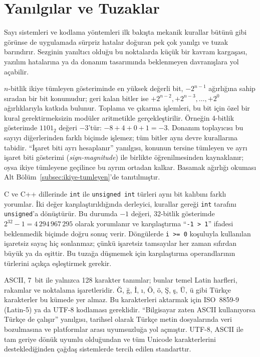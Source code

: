 \section{Yanılgılar ve Tuzaklar}
\label{sec:yanilgilar-tuzaklar-sayi-sistemleri}

Sayı sistemleri ve kodlama yöntemleri ilk bakışta mekanik kurallar bütünü gibi görünse de uygulamada sürpriz hatalar doğuran pek çok yanılgı ve tuzak barındırır. Sezginin yanıltıcı olduğu bu noktalarda küçük bir kavram kargaşası, yazılım hatalarına ya da donanım tasarımında beklenmeyen davranışlara yol açabilir.

$n$-bitlik ikiye tümleyen gösteriminde en yüksek değerli bit, $-2^{n-1}$ ağırlığına sahip sıradan bir bit konumudur; geri kalan bitler ise $+2^{n-2}, +2^{n-3}, \ldots, +2^0$ ağırlıklarıyla katkıda bulunur. Toplama ve çıkarma işlemleri, bu bit için özel bir kural gerektirmeksizin modüler aritmetikle gerçekleştirilir. Örneğin 4-bitlik gösterimde $1101_2$ değeri $-3$'tür: $-8 + 4 + 0 + 1 = -3$. Donanım toplayıcısı bu sayıyı diğerlerinden farklı biçimde işlemez; tüm bitler aynı devre kurallarına tabidir. ``İşaret biti ayrı hesaplanır'' yanılgısı, konunun tersine tümleyen ve ayrı işaret biti gösterimi (\emph{sign-magnitude}) ile birlikte öğrenilmesinden kaynaklanır; oysa ikiye tümleyene geçilince bu ayrım ortadan kalkar. Basamak ağırlığı okuması Alt Bölüm~\ref{subsec:ikiye-tumleyen}'de tanıtılmıştır.

C ve C++ dillerinde \texttt{int} ile \texttt{unsigned int} türleri aynı bit kalıbını farklı yorumlar. İki değer karşılaştırıldığında derleyici, kurallar gereği \texttt{int} tarafını \texttt{unsigned}'a dönüştürür. Bu durumda $-1$ değeri, 32-bitlik gösterimde $2^{32}-1 = 4\,294\,967\,295$ olarak yorumlanır ve karşılaştırma ``\texttt{-1 > 1}'' ifadesi beklenmedik biçimde doğru sonuç verir. Döngülerde \texttt{i >= 0} koşuluyla kullanılan işaretsiz sayaç hiç sonlanmaz; çünkü işaretsiz tamsayılar her zaman sıfırdan büyük ya da eşittir. Bu tuzağa düşmemek için karşılaştırma operandlarının türlerini açıkça eşleştirmek gerekir.

ASCII, 7~bit ile yalnızca 128 karakter tanımlar; bunlar temel Latin harfleri, rakamlar ve noktalama işaretleridir. Ğ, ğ, İ, ı, Ö, ö, Ş, ş, Ü, ü gibi Türkçe karakterler bu kümede yer almaz. Bu karakterleri aktarmak için ISO~8859-9 (Latin-5) ya da UTF-8 kodlaması gereklidir. ``Bilgisayar zaten ASCII kullanıyorsa Türkçe de çalışır'' yanılgısı, tarihsel olarak Türkçe metin dosyalarında veri bozulmasına ve platformlar arası uyumsuzluğa yol açmıştır. UTF-8, ASCII ile tam geriye dönük uyumlu olduğundan ve tüm Unicode karakterlerini desteklediğinden çağdaş sistemlerde tercih edilen standarttır.

